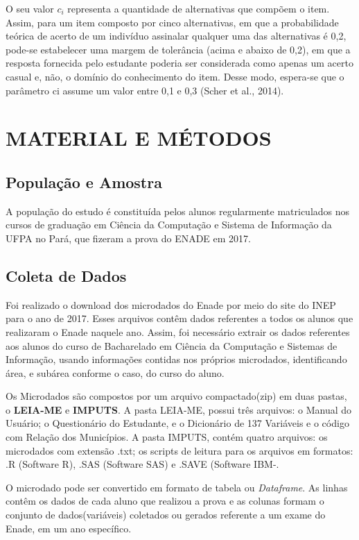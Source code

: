 \documentclass[12pt]{article}
\begin{document}
O seu valor $c_{i}$  representa a quantidade de alternativas que compõem o item. Assim, para um item composto por cinco alternativas, em que a probabilidade teórica de acerto de um indivíduo assinalar qualquer uma das alternativas é 0,2, pode-se estabelecer uma margem de tolerância (acima e abaixo de 0,2), em que a resposta fornecida pelo estudante poderia ser considerada como apenas um acerto casual e, não, o domínio do conhecimento do item. Desse modo, espera-se que o parâmetro ci assume um valor entre 0,1 e 0,3 (Scher et al., 2014).




\section{MATERIAL E MÉTODOS}

\subsection{População e Amostra}
\label{sec:metmodal}

A população do estudo é constituída pelos alunos regularmente matriculados nos cursos de graduação em Ciência da Computação e Sistema de Informação da UFPA no Pará, que fizeram a prova do ENADE em 2017.\vskip0.3cm


\subsection{Coleta de Dados}

Foi realizado o download dos microdados do Enade por meio do site do INEP
para o ano de 2017. Esses arquivos contêm dados referentes a todos os alunos que realizaram o Enade naquele ano. Assim, foi necessário extrair os dados referentes aos alunos do curso de Bacharelado em Ciência da Computação e Sistemas de Informação, usando informações contidas nos próprios microdados, identificando área, e subárea conforme o caso, do curso do aluno. 

Os Microdados são compostos por um arquivo compactado(zip) em duas pastas, o \textbf{LEIA-ME} e \textbf{IMPUTS}. A pasta LEIA-ME, possui três arquivos: o Manual do Usuário; o Questionário do Estudante, e o Dicionário de 137 Variáveis e o código com Relação dos Municípios. A pasta IMPUTS, contém quatro arquivos: os microdados com extensão .txt; os scripts de leitura para os arquivos em formatos: .R (Software R), .SAS (Software SAS) e .SAVE (Software IBM-.

O microdado pode ser convertido em formato de tabela ou \textit{Dataframe}. As linhas contêm os dados de cada aluno que realizou a prova e as colunas formam o conjunto de dados(variáveis) coletados ou gerados referente a um exame do Enade, em um ano específico.
\end{document}
